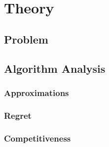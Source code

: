 
\chapter{Theory}\label{chapter:theory}

\section{Problem}

\section{Algorithm Analysis}

\subsection{Approximations}

\subsection{Regret}

\subsection{Competitiveness}

